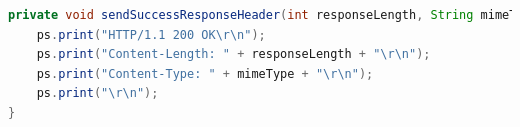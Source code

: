 \documentclass{article}
\begin{document}
\begin{lstlisting}[label=lst:01_part1_impl_tinyhttpd_sendSuccessResponseHeader, caption=CLI command to start a GitLab runner in a Docker container, language=java, numbers=none]
private void sendSuccessResponseHeader(int responseLength, String mimeType) {
    ps.print("HTTP/1.1 200 OK\r\n");
    ps.print("Content-Length: " + responseLength + "\r\n");
    ps.print("Content-Type: " + mimeType + "\r\n");
    ps.print("\r\n");
}
\end{lstlisting}
\end{document}
